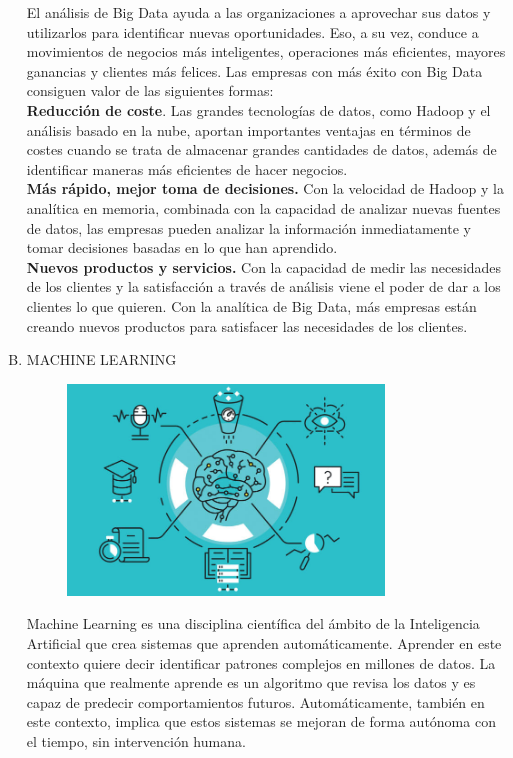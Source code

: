\documentclass[preprint,12pt]{elsarticle}
\begin{document}
\begin{enumerate}[A)]
			El análisis de Big Data ayuda a las organizaciones a aprovechar sus datos y utilizarlos para identificar nuevas oportunidades. Eso, a su vez, conduce a movimientos de negocios más inteligentes, operaciones más eficientes, mayores ganancias y clientes más felices. Las empresas con más éxito con Big Data consiguen valor de las siguientes formas:\\
			
			\textbf{Reducción de coste}. Las grandes tecnologías de datos, como Hadoop y el análisis basado en la nube, aportan importantes ventajas en términos de costes cuando se trata de almacenar grandes cantidades de datos, además de identificar maneras más eficientes de hacer negocios.\\
			
			\textbf{Más rápido, mejor toma de decisiones.} Con la velocidad de Hadoop y la analítica en memoria, combinada con la capacidad de analizar nuevas fuentes de datos, las empresas pueden analizar la información inmediatamente y tomar decisiones basadas en lo que han aprendido.\\
			
			\textbf{Nuevos productos y servicios.} Con la capacidad de medir las necesidades de los clientes y la satisfacción a través de análisis viene el poder de dar a los clientes lo que quieren. Con la analítica de Big Data, más empresas están creando nuevos productos para satisfacer las necesidades de los clientes.\\
			
							
			\item MACHINE LEARNING 
			
			\begin{figure}[htb]
				\begin{center}
					\includegraphics[width=8.41cm]{./Imagenes/img2}
				\end{center}
			\end{figure}
		
			Machine Learning es una disciplina científica del ámbito de la Inteligencia Artificial que crea sistemas que aprenden automáticamente. Aprender en este contexto quiere decir identificar patrones complejos en millones de datos. La máquina que realmente aprende es un algoritmo que revisa los datos y es capaz de predecir comportamientos futuros. Automáticamente, también en este contexto, implica que estos sistemas se mejoran de forma autónoma con el tiempo, sin intervención humana.\cite{bib01:BA:Online} \\
			

\end{enumerate}
\end{document}
